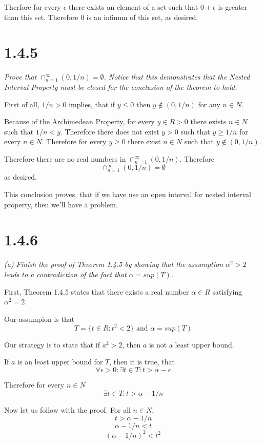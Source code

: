 \documentclass[11pt,oneside,titlepage]{article}
\begin{document}
Therfore for every $\epsilon$ there exists an element of a set such that
$0 + \epsilon$ is greater than this set. Therefore 0 is an infinum of this set,
as desired.

\section*{1.4.5}
\textit{Prove that $\cap^{\infty}_{n = 1}(0, 1/n) = \emptyset$. Notice that
  this demonstrates that the Nested Interval Property must be closed for the
  conclusion of the theorem to hold.}

First of all, $1/n > 0$ implies, that if $y \leq 0$ then $y \notin (0, 1/n)$
for any $n \in N$.

Because of the Archimedean Property, for every $y \in R > 0$ there exists
$n \in N$ such that $1/n < y$. Therefore there does not exist $y > 0$ such
that $y \geq 1/n$ for every $n \in N$. Therefore for every $y \geq 0$ there
exist $n \in N$ such that $y \notin (0, 1/n)$.

Therefore there are no real
numbers in $\cap^{\infty}_{n = 1}(0, 1/n)$. Therefore 
$$\cap^{\infty}_{n = 1}(0, 1/n) = \emptyset$$
as desired.

This conclusion proves, that if we have use an open interval for nested
interval property, then we'll have a problem.

\section*{1.4.6}
\textit{(a) Finish the proof of Theorem 1.4.5 by showing that the assumption
  $\alpha ^ 2 > 2$ leads to a contradiction of the fact that
  $\alpha = sup(T)$.}

First, Theorem 1.4.5 states that there exists a real number $\alpha \in R$
satisfying $\alpha ^ 2 = 2$.

Our assumpion is that
$$T = \{t \in R: t ^ 2 < 2\}\text{ and }\alpha = sup(T)$$

Our strategy is to state that if $a^2 > 2$, then $a$ is not a least upper
bound.

If $a$ is an least upper bound for $T$, then it is true, that
$$\forall \epsilon > 0: \exists t \in T: t > \alpha - \epsilon $$

Therefore for every $n \in N$
$$\exists t \in T: t > \alpha - 1/n $$

Now let us follow with the proof. For all $n \in N$.
$$t > \alpha - 1/n $$
$$\alpha - 1/n < t $$
$$(\alpha - 1/n)^2 < t^2 $$
\end{document}
